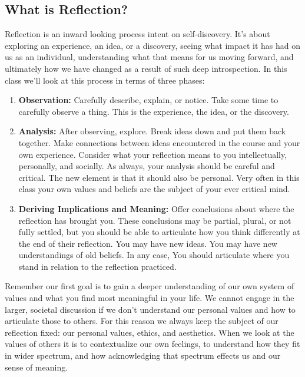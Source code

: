 \documentclass[nobib]{tufte-handout}
\begin{document}
\subsection*{What is Reflection?}

Reflection is an inward looking process intent on self-discovery. It's about exploring an experience, an idea, or a discovery, seeing what impact it has had on us as an individual, understanding what that means for us moving forward, and ultimately how we have changed as a result of such deep introspection. In this class we'll look at this process in terms of three phases:
\begin{enumerate}
\item \textbf{Observation:} Carefully describe, explain, or notice. Take some time to carefully observe a thing. This is the experience, the idea, or the discovery. \newline

\item \textbf{Analysis:} After observing, explore. Break ideas down and put them back together. Make connections between ideas encountered in the course and your own experience. Consider what your reflection means to you intellectually, personally, and socially.  As always, your analysis should be careful and critical. The new element is that it should also be personal.  Very often in this class your own values and beliefs are the subject of your ever critical mind. \newline

\item \textbf{Deriving Implications and Meaning:} Offer conclusions about where the reflection has brought you. These conclusions may be partial, plural, or not fully settled, but you should be able to articulate how you think differently at the end of their reflection. You may have new ideas. You may have new understandings of old beliefs. In any case, You should articulate where you stand in relation to the reflection practiced.
\end{enumerate}

Remember our first goal is to gain a deeper understanding of our own system of values and what you find most meaningful in your life. We cannot engage in the larger, societal discussion if we don't understand our personal values and how to articulate those to others. For this reason we always keep the subject of our reflection fixed: our personal values, ethics, and aesthetics. When we look at the values of others it is to contextualize our own feelings, to understand how they fit in wider spectrum, and how acknowledging that spectrum effects us and our sense of meaning.
\end{document}
